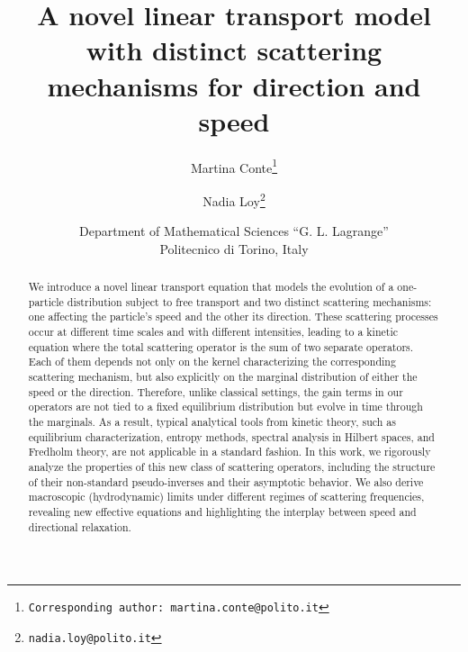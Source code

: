 \documentclass[a4paper]{article}
\theoremstyle{Theorem}\newtheorem{proposition}{Proposition}[section]
\theoremstyle{Remark}\newtheorem{remark}{Remark}[section]
\theoremstyle{Theorem}\newtheorem{theorem}{Theorem}[section]
\begin{document}
\title{A novel linear transport model with distinct scattering mechanisms for direction and speed}
\author{Martina Conte\thanks{\texttt{Corresponding author: martina.conte@polito.it}} \and Nadia Loy\thanks{\texttt{nadia.loy@polito.it}}}
\date{\small Department of Mathematical Sciences ``G. L. Lagrange'' \\ Politecnico di Torino, Italy}

\maketitle

\begin{abstract}
We introduce a novel linear transport equation that models the evolution of a one-particle distribution subject to free transport and two distinct scattering mechanisms: one affecting the particle's speed and the other its direction. These scattering processes occur at different time scales and with different intensities, leading to a kinetic equation where the total scattering operator is the sum of two separate operators. Each of them depends not only on the kernel characterizing the corresponding scattering mechanism, but also explicitly on the marginal distribution of either the speed or the direction. Therefore, unlike classical settings, the gain terms in our operators are not tied to a fixed equilibrium distribution but evolve in time through the marginals. As a result, typical analytical tools from kinetic theory, such as equilibrium characterization, entropy methods, spectral analysis in Hilbert spaces, and Fredholm theory, are not applicable in a standard fashion. In this work, we rigorously analyze the properties of this new class of scattering operators, including the structure of their non-standard pseudo-inverses and their asymptotic behavior. We also derive macroscopic (hydrodynamic) limits under different regimes of scattering frequencies, revealing new effective equations and highlighting the interplay between speed and directional relaxation.



\end{abstract}
\end{document}
